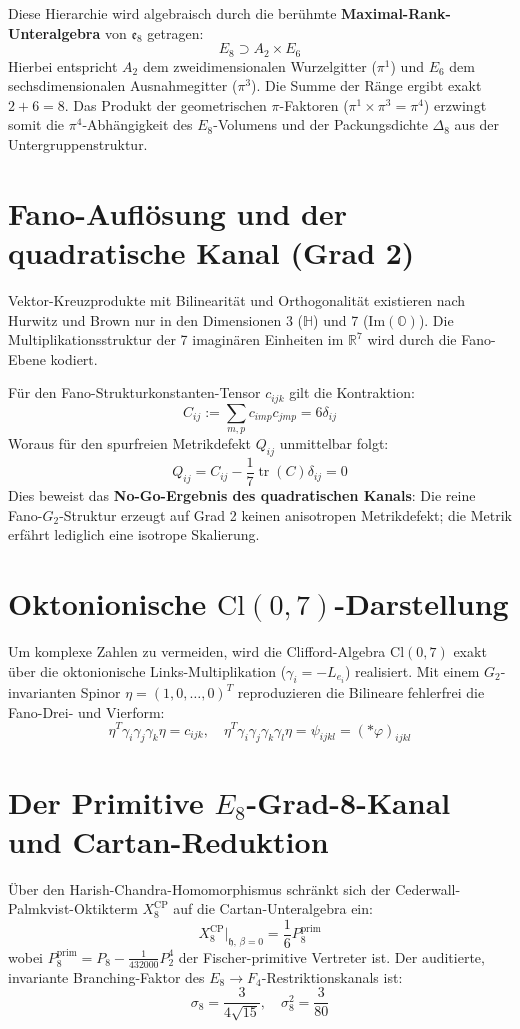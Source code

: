 \documentclass[11pt,a4paper]{article}
\begin{document}
Diese Hierarchie wird algebraisch durch die berühmte \textbf{Maximal-Rank-Unteralgebra} von $\mathfrak{e}_8$ getragen:
$$E_8 \supset A_2 \times E_6$$
Hierbei entspricht $A_2$ dem zweidimensionalen Wurzelgitter ($\pi^1$) und $E_6$ dem sechsdimensionalen Ausnahmegitter ($\pi^3$). Die Summe der Ränge ergibt exakt $2 + 6 = 8$. Das Produkt der geometrischen $\pi$-Faktoren ($\pi^1 \times \pi^3 = \pi^4$) erzwingt somit die $\pi^4$-Abhängigkeit des $E_8$-Volumens und der Packungsdichte $\Delta_8$ aus der Untergruppenstruktur.

\section{Fano-Auflösung und der quadratische Kanal (Grad 2)}
Vektor-Kreuzprodukte mit Bilinearität und Orthogonalität existieren nach Hurwitz und Brown nur in den Dimensionen 3 ($\mathbb{H}$) und 7 ($\text{Im}(\mathbb{O})$). Die Multiplikationsstruktur der 7 imaginären Einheiten im $\mathbb{R}^7$ wird durch die Fano-Ebene kodiert. 

Für den Fano-Strukturkonstanten-Tensor $c_{ijk}$ gilt die Kontraktion:
$$C_{ij} := \sum_{m,p} c_{imp} c_{jmp} = 6\delta_{ij}$$
Woraus für den spurfreien Metrikdefekt $Q_{ij}$ unmittelbar folgt:
$$Q_{ij} = C_{ij} - \frac{1}{7}\operatorname{tr}(C)\delta_{ij} = 0$$
Dies beweist das \textbf{No-Go-Ergebnis des quadratischen Kanals}: Die reine Fano-$G_2$-Struktur erzeugt auf Grad 2 keinen anisotropen Metrikdefekt; die Metrik erfährt lediglich eine isotrope Skalierung.

\section{Oktonionische $\text{Cl}(0,7)$-Darstellung}
Um komplexe Zahlen zu vermeiden, wird die Clifford-Algebra $\text{Cl}(0,7)$ exakt über die oktonionische Links-Multiplikation ($\gamma_i = -L_{e_i}$) realisiert. Mit einem $G_2$-invarianten Spinor $\eta = (1, 0, \dots, 0)^T$ reproduzieren die Bilineare fehlerfrei die Fano-Drei- und Vierform:
$$\eta^T \gamma_i \gamma_j \gamma_k \eta = c_{ijk}, \quad \eta^T \gamma_i \gamma_j \gamma_k \gamma_l \eta = \psi_{ijkl} = (*\varphi)_{ijkl}$$

\section{Der Primitive $E_8$-Grad-8-Kanal und Cartan-Reduktion}
Über den Harish-Chandra-Homomorphismus schränkt sich der Cederwall-Palmkvist-Oktikterm $X_8^{\text{CP}}$ auf die Cartan-Unteralgebra ein:
$$X_8^{\text{CP}}\big|_{\mathfrak{h}, \, \beta=0} = \frac{1}{6} P_8^{\text{prim}}$$
wobei $P_8^{\text{prim}} = P_8 - \frac{1}{432000} P_2^4$ der Fischer-primitive Vertreter ist. Der auditierte, invariante Branching-Faktor des $E_8 \to F_4$-Restriktionskanals ist:
$$\sigma_8 = \frac{3}{4\sqrt{15}}, \quad \sigma_8^2 = \frac{3}{80}$$
\end{document}
